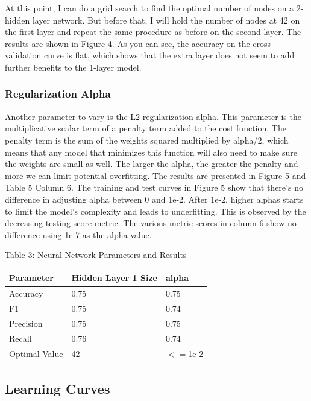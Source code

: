 \documentclass{article}
\begin{document}
At this point, I can do a grid search to find the optimal number of nodes on a 2-hidden layer network. But before that, I will hold the number of nodes at 42 on the first layer and repeat the same procedure as before on the second layer. The results are shown in Figure 4. As you can see, the accuracy on the cross-validation curve is flat, which shows that the extra layer does not seem to add further benefits to the 1-layer model. 

\subsubsection*{Regularization Alpha}

Another parameter to vary is the L2 regularization alpha. This parameter is the multiplicative scalar term of a penalty term added to the cost function. The penalty term is the sum of the weights squared multiplied by alpha/2, which means that any model that minimizes this function will also need to make sure the weights are small as well. The larger the alpha, the greater the penalty and more we can limit potential overfitting. The results are presented in Figure 5 and Table 5 Column 6. The training and test curves in Figure 5 show that there's no difference in adjusting alpha between 0 and 1e-2. After 1e-2, higher alphas starts to limit the model's complexity and leads to underfitting. This is observed by the decreasing testing score metric. The various metric scores in column 6 show no difference using 1e-7 as the alpha value. 


\begin{table}

	\centering
	Table 3: Neural Network Parameters and Results\\
	\begin{tabular}{ l l l }
		\hline
		Parameter & Hidden Layer 1 Size& alpha\\
		\hline
		Accuracy & 0.75 & 0.75 \\
		F1 & 0.75 & 0.74 \\
		Precision & 0.75 & 0.75 \\
		Recall & 0.76 & 0.74\\
		Optimal Value & 42 & $<=$1e-2 \\

	
		\hline 
	\end{tabular}
\end{table}

\subsection*{Learning Curves}
\end{document}
